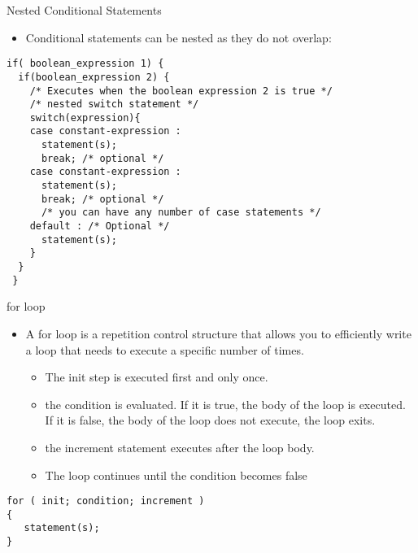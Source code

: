\documentclass[10pt,t]{beamer}
\begin{document}
\begin{frame}[fragile]{Nested Conditional Statements}
  \begin{itemize}
    \item Conditional statements can be nested as they do not overlap:
  \end{itemize}
  \begin{lstlisting}
if( boolean_expression 1) {
  if(boolean_expression 2) {
    /* Executes when the boolean expression 2 is true */
    /* nested switch statement */
    switch(expression){
    case constant-expression :
      statement(s);
      break; /* optional */
    case constant-expression :
      statement(s);
      break; /* optional */
      /* you can have any number of case statements */
    default : /* Optional */
      statement(s);
    }
  }
 }
  \end{lstlisting}
\end{frame}

\begin{frame}[fragile]{for loop}
  \begin{itemize}
    \item A for loop is a repetition control structure that allows you to efficiently write a loop that needs to execute a specific number of times.
      \begin{itemize}
        \item The init step is executed first and only once.
        \item the condition is evaluated. If it is true, the body of the loop is executed. If it is false, the body of the loop does not execute, the loop exits.
        \item the increment statement executes after the loop body.
        \item The loop continues until the condition becomes false
      \end{itemize}
  \end{itemize}
  \begin{block}{}
    \begin{lstlisting}
for ( init; condition; increment )
{
   statement(s);
}
    \end{lstlisting}
  \end{block}
\end{frame}
\end{document}
